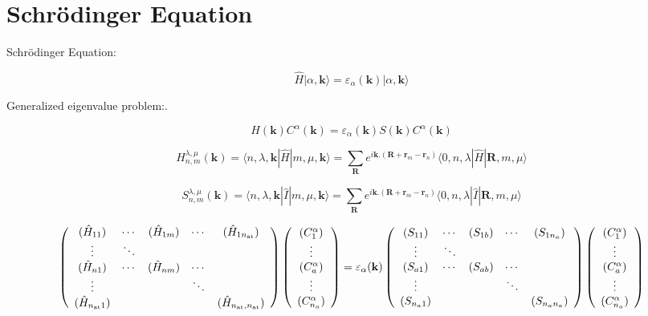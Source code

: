 \documentclass{article}
\newcommand{\bra}[1]{\langle #1|}
\newcommand{\ket}[1]{|#1\rangle}
\newcommand{\op}[1]{\hat{#1}}
\begin{document}
\section{Schr\"odinger Equation}

\noindent
Schr\"odinger Equation:

\[\displaystyle \op{H} \ket{\alpha, \mathbf{k} }=\varepsilon_{\alpha}(\mathbf{k}) \ket{\alpha, \mathbf{k} }\]

\noindent
Generalized eigenvalue problem:.

\[\displaystyle  H(\mathbf{k})C^{\alpha}(\mathbf{k})= \varepsilon_{\alpha}(\mathbf{k})     S(\mathbf{k})C^{\alpha}(\mathbf{k})\]


\noindent
\[\displaystyle H_{n,m}^{\lambda,\mu}(\mathbf{k})=\bra{ n,\lambda,\mathbf{k}} \op{H}\ket{ m,\mu,\mathbf{k}}=
\sum_{\mathbf{R}} e^{i\mathbf{k}.(\mathbf{R}+\mathbf{r}_{m}-\mathbf{r}_n)} \bra{ 0,n,\lambda} \op{H} \ket{\mathbf{R},m,\mu}\]


\[\displaystyle  S_{n,m}^{\lambda,\mu}(\mathbf{k})=\bra{n,\lambda,\mathbf{k}}\op{I}\ket{ m,\mu,\mathbf{k}}=
\sum_{\mathbf{R}} e^{i\mathbf{k}.(\mathbf{R}+\mathbf{r}_{m}-\mathbf{r}_n)}
\bra{ 0,n,\lambda}\op{I}\ket{\mathbf{R},m,\mu }\]

\noindent
\[ \left( \begin{array}{c c c c c}
(\hat{H}_{1 1}) & \cdots & (\hat{H}_{1 m}) & \cdots & (\hat{H}_{1 n_{\text{at}}}) \\
\vdots & \ddots & & & \\
(\hat{H}_{n 1}) & \cdots & (\hat{H}_{n m}) & \cdots & \\
\vdots & & & \ddots & \\
(\hat{H}_{n_{\text{at}} 1}) & & & & (\hat{H}_{n_{\text{at}}, n_{\text{at}}})
\end{array} \right )
\left( \begin{array}{c}
(C_1^{\alpha}) \\
\vdots \\
(C_{a}^{\alpha}) \\
\vdots \\
(C_{n_a}^{\alpha})
\end{array} \right )= \varepsilon_{\alpha}(\mathbf{k})
\left( \begin{array}{c c c c c}
(S_{1 1}) & \cdots & (S_{1 b}) & \cdots & (S_{1 n_a}) \\
\vdots & \ddots & & & \\
(S_{a 1}) & \cdots & (S_{a b}) & \cdots & \\
\vdots & & & \ddots & \\
(S_{n_a 1 }) & & & & (S_{n_a n_a})
\end{array} \right )
\left( \begin{array}{c}
(C_1^{\alpha}) \\
\vdots \\
(C_{a}^{\alpha}) \\
\vdots \\
(C_{n_a}^{\alpha})
\end{array} \right )
\]
\end{document}
